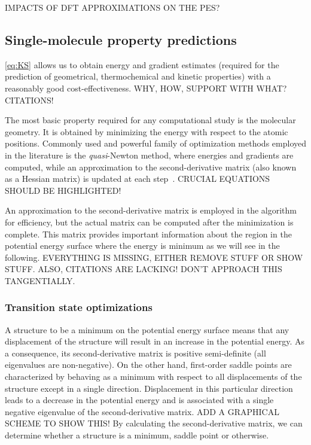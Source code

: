 IMPACTS OF DFT APPROXIMATIONS ON THE PES?\@


\subsection{Single-molecule property predictions}\label{sec:optimizations}

\cref{eq:KS} allows us to obtain energy and gradient estimates (required for
the prediction of geometrical, thermochemical and kinetic properties) with a
reasonably good cost-effectiveness.
WHY, HOW, SUPPORT WITH WHAT?\@ CITATIONS!\@

The most basic property required for any computational study is the molecular
geometry.
It is obtained by minimizing the energy with respect to the atomic positions.
Commonly used and powerful family of optimization methods employed in the
literature is the \emph{quasi}-Newton method, where energies and gradients are
computed, while an approximation to the second-derivative matrix (also known as
a Hessian matrix) is updated at each step~\cite{Banerjee_1985,Schlegel_1987}.
CRUCIAL EQUATIONS SHOULD BE HIGHLIGHTED!\@

An approximation to the second-derivative matrix is employed in the algorithm
for efficiency, but the actual matrix can be computed after the minimization is
complete.
This matrix provides important information about the region in the potential
energy surface where the energy is minimum as we will see in the following.
EVERYTHING IS MISSING, EITHER REMOVE STUFF OR SHOW STUFF.\@
ALSO, CITATIONS ARE LACKING!\@
DON'T APPROACH THIS TANGENTIALLY.\@

\subsubsection{Transition state optimizations}\label{sec:ts-optimizations}

A structure to be a minimum on the potential energy surface means that any
displacement of the structure will result in an increase in the potential
energy.
As a consequence, its second-derivative matrix
is positive semi-definite (all eigenvalues are non-negative).
On the other hand, first-order saddle points are characterized by behaving as
a minimum with respect to all displacements of the structure except in a single
direction.
Displacement in this particular direction leads to a decrease in the potential
energy and is associated with a single negative eigenvalue of the
second-derivative matrix.
ADD A GRAPHICAL SCHEME TO SHOW THIS!\@
By calculating the second-derivative matrix, we can determine whether a structure
is a minimum, saddle point or otherwise.

